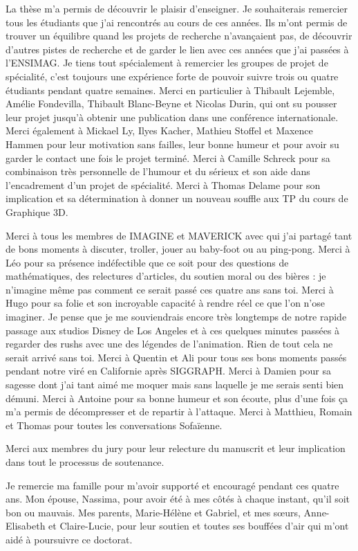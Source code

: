 La thèse m'a permis de découvrir le plaisir d'enseigner. Je souhaiterais remercier tous les étudiants que j'ai rencontrés au cours de ces années.
Ils m'ont permis de trouver un équilibre quand les projets de recherche n’avançaient pas, de découvrir d'autres pistes de recherche et de garder le lien avec ces années que j'ai passées à l'ENSIMAG. Je tiens tout spécialement à remercier les groupes de projet de spécialité, c'est toujours une expérience forte de pouvoir suivre trois ou quatre étudiants pendant quatre semaines. Merci en particulier à Thibault Lejemble, Amélie Fondevilla, Thibault Blanc-Beyne et Nicolas Durin, qui ont su pousser leur projet jusqu'à obtenir une publication dans une conférence internationale. Merci également à Mickael Ly, Ilyes Kacher, Mathieu Stoffel et Maxence Hammen pour leur motivation sans failles, leur bonne humeur et pour avoir su garder le contact une fois le projet terminé. Merci à Camille Schreck pour sa combinaison très personnelle de l'humour et du sérieux et son aide dans l'encadrement d'un projet de spécialité. Merci à Thomas Delame pour son implication et sa détermination à donner un nouveau souffle aux TP du cours de Graphique 3D.


Merci à tous les membres de IMAGINE et MAVERICK avec qui j'ai partagé tant de bons moments à discuter, troller, jouer au baby-foot ou au ping-pong.
Merci à Léo pour sa présence indéfectible que ce soit pour des questions de mathématiques, des relectures d'articles, du soutien moral ou des bières : je n'imagine même pas comment ce serait passé ces quatre ans sans toi.
Merci à Hugo pour sa folie et son incroyable capacité à rendre réel ce que l'on n'ose imaginer. Je pense que je me souviendrais encore très longtemps de notre rapide passage aux studios Disney de Los Angeles et à ces quelques minutes passées à regarder des rushs avec une des légendes de l'animation. Rien de tout cela ne serait arrivé sans toi.
Merci à Quentin et Ali pour tous ses bons moments passés pendant notre viré en Californie après SIGGRAPH.
Merci à Damien pour sa sagesse dont j'ai tant aimé me moquer mais sans laquelle je me serais senti bien démuni.
Merci à Antoine pour sa bonne humeur et son écoute, plus d'une fois ça m'a permis de décompresser et de repartir à l'attaque.
Merci à Matthieu, Romain et Thomas pour toutes les conversations Sofaïenne.

Merci aux membres du jury pour leur relecture du manuscrit et leur implication dans tout le processus de soutenance.

Je remercie ma famille pour m'avoir supporté et encouragé pendant ces quatre ans.
Mon épouse, Nassima, pour avoir été à mes côtés à chaque instant, qu'il soit bon ou mauvais.
Mes parents, Marie-Hélène et Gabriel, et mes sœurs, Anne-Elisabeth et Claire-Lucie, pour leur soutien et toutes ses bouffées d'air qui m'ont aidé à poursuivre ce doctorat.
